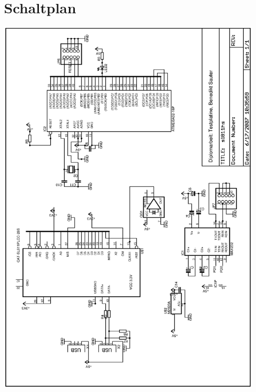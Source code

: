 \begingroup
\renewcommand*{\chapterheadendvskip}{\vskip 0cm}
\chapter{Schaltplan}
\enlargethispage{100cm}
\includegraphics[scale=0.7]{schaltplan.ps}
\endgroup

